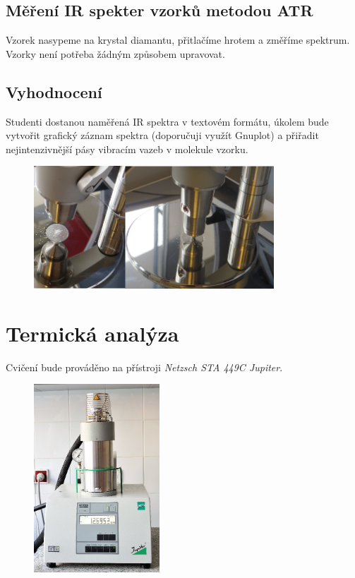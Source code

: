 \documentclass[12pt]{article}
\begin{document}
\subsection{Měření IR spekter vzorků metodou ATR}
Vzorek nasypeme na krystal diamantu, přitlačíme hrotem a změříme spektrum. Vzorky není potřeba žádným způsobem upravovat.

\subsection{Vyhodnocení}

Studenti dostanou naměřená IR spektra v textovém formátu, úkolem bude vytvořit grafický záznam spektra (doporučuji využít Gnuplot) a přiřadit nejintenzivnější pásy vibracím vazeb v molekule vzorku.

\begin{figure}[H]
	\centering
	\includegraphics[keepaspectratio,width=9cm]{img/atr.png}
\end{figure}

\newpage
\section{Termická analýza}

Cvičení bude prováděno na přístroji \textit{Netzsch STA 449C Jupiter}.

\begin{figure}[H]
	\centering
	\includegraphics[keepaspectratio,width=47mm]{img/Netzsch.png}
\end{figure}
\end{document}
